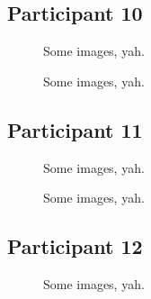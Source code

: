 \clearpage

\subsection{Participant 10}

\begin{figure}[h]
	\caption{Some images, yah.}
\end{figure}

\clearpage

\begin{figure}[h]
	\caption{Some images, yah.}
\end{figure}


\clearpage

\subsection{Participant 11}

\begin{figure}[h]
	\caption{Some images, yah.}
\end{figure}

\clearpage

\begin{figure}[h]
	\caption{Some images, yah.}
\end{figure}


\clearpage

\subsection{Participant 12}

\begin{figure}[h]
	\caption{Some images, yah.}
\end{figure}

\clearpage

